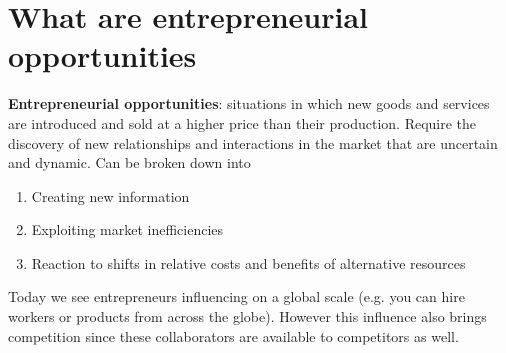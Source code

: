 \documentclass{article}
\begin{document}
  \section{What are entrepreneurial opportunities}
    \textbf{Entrepreneurial opportunities}: situations in which new goods and services are introduced and sold at a higher price than their production. Require the discovery of new relationships and interactions in the market that are uncertain and dynamic. Can be broken down into
    \begin{enumerate}
      \item Creating new information
      \item Exploiting market inefficiencies
      \item Reaction to shifts in relative costs and benefits of alternative resources
    \end{enumerate} 
    Today we see entrepreneurs influencing on a global scale (e.g. you can hire workers or products from across the globe). However this influence also brings competition since these collaborators are available to competitors as well.
\end{document}
